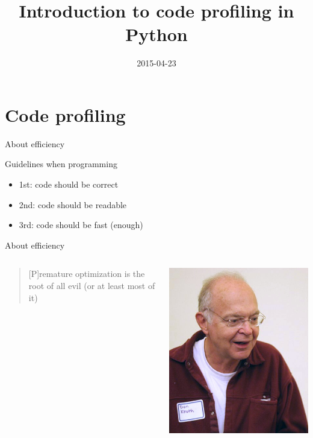 \documentclass[big]{beamer}
\author{}
\date{2015-04-23}
\title{Introduction to code profiling in Python}
\begin{document}
\maketitle

\section{Code profiling}
\label{sec-1}

\begin{frame}[label=sec-1-1]{About efficiency}
\begin{block}{Guidelines when programming}
\begin{itemize}
\item 1st: code should be \alert{correct}
\item 2nd: code should be \alert{readable}
\item 3rd: code should be \alert{fast (enough)}
\end{itemize}
\end{block}
\end{frame}
\begin{frame}[label=sec-1-2]{About efficiency}
\begin{columns}
\begin{column}{0.7\textwidth}
\begin{quote}
[P]remature optimization is the root of all evil (or at least most of it)
\end{quote}
\end{column}
\begin{column}{0.3\textwidth}
\includegraphics[width=.9\linewidth]{img/wiki-KnuthAtOpenContentAlliance.jpg}
\end{column}
\end{columns}
\end{frame}
\end{document}
